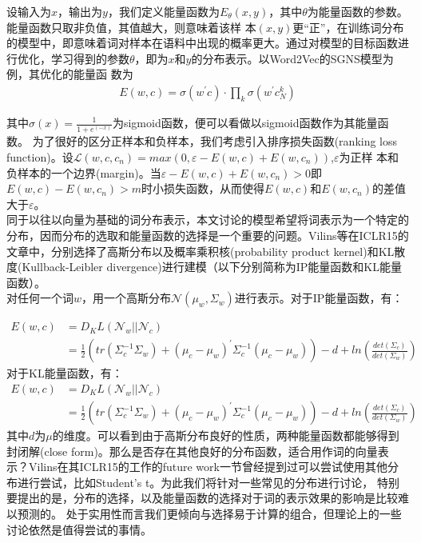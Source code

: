 \documentclass[13pt]{article}
\begin{document}
设输入为$x$，输出为$y$，我们定义能量函数为$E_\theta(x,y)$，其中$\theta$为能量函数的参数。能量函数只取非负值，其值越大，则意味着该样
本$(x,y)$更“正”，在训练词分布的模型中，即意味着词对样本在语料中出现的概率更大。通过对模型的目标函数进行优化，学习得到的参数$\theta$，即为$x$和$y$的分布表示。以Word2Vec的SGNS模型为例，其优化的能量函
数为
\begin{align*}
E(w,c)=\sigma(w^{\prime{}}c)\cdot\prod_k\sigma(w^{\prime{}}c_N^k)
\end{align*}

其中$\sigma(x)=\frac{1}{1+e^(-x)}$为sigmoid函数，便可以看做以sigmoid函数作为其能量函数。
为了很好的区分正样本和负样本，我们考虑引入排序损失函数(ranking loss function)。设$\mathcal{L}(w,c,c_n)=max(0,\varepsilon-E(w,c)+E(w,c_n))$,$\varepsilon$为正样
本和负样本的一个边界(margin)。当$\varepsilon-E(w,c)+E(w,c_n)>0$即$E(w,c)-E(w,c_n)>m$时小损失函数，从而使得$E(w,c)$和$E(w,c_n)$的差值大于$\varepsilon$。\\

同于以往以向量为基础的词分布表示，本文讨论的模型希望将词表示为一个特定的分布，因而分布的选取和能量函数的选择是一个重要的问题。Vilins等在ICLR15的文章中，分别选择了高斯分布以及概率乘积核(probability product kernel)和KL散度(Kullback-Leibler divergence)进行建模（以下分别简称为IP能量函数和KL能量函数）。\\

对任何一个词$w$，用一个高斯分布$\mathcal{N}(\mu_w,\Sigma_w)$进行表示。对于IP能量函数，有：

\begin{align*}
E(w,c)&=D_KL(\mathcal{N}_w||\mathcal{N}_c)\\
&=\frac{1}{2}(tr(\Sigma_c^{-1}\Sigma_w)+(\mu_c-\mu_w)^{\prime{}}\Sigma_c^{-1}(\mu_c-\mu_w))-d+ln(\frac{det(\Sigma_c)}{det(\Sigma_w)})
\end{align*}
对于KL能量函数，有：
\begin{align*}
E(w,c)&=D_KL(\mathcal{N}_w||\mathcal{N}_c)\\
&=\frac{1}{2}(tr(\Sigma_c^{-1}\Sigma_w)+(\mu_c-\mu_w)^{\prime{}}\Sigma_c^{-1}(\mu_c-\mu_w))-d+ln(\frac{det(\Sigma_c)}{det(\Sigma_w)})
\end{align*}
其中$d$为$\mu$的维度。可以看到由于高斯分布良好的性质，两种能量函数都能够得到封闭解(close form)。那么是否存在其他良好的分布函数，适合用作词的向量表示？Vilins在其ICLR15的工作的future work一节曾经提到过可以尝试使用其他分布进行尝试，比如Student’s t。为此我们将针对一些常见的分布进行讨论，
特别要提出的是，分布的选择，以及能量函数的选择对于词的表示效果的影响是比较难以预测的。
处于实用性而言我们更倾向与选择易于计算的组合，但理论上的一些讨论依然是值得尝试的事情。\\
\end{document}
